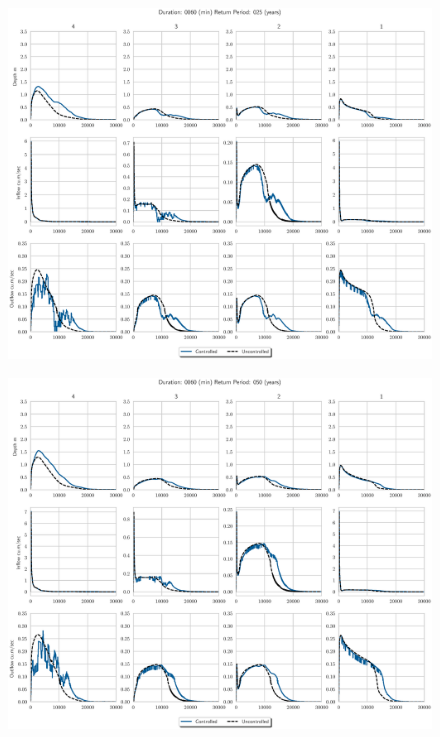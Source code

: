 \begin{figure}
    \centering
    \includegraphics[width=\linewidth]{./RL-SI-figures/77storms/0060025.eps}
\end{figure}
\begin{figure}
    \centering
    \includegraphics[width=\linewidth]{./RL-SI-figures/77storms/0060050.eps}
\end{figure}
